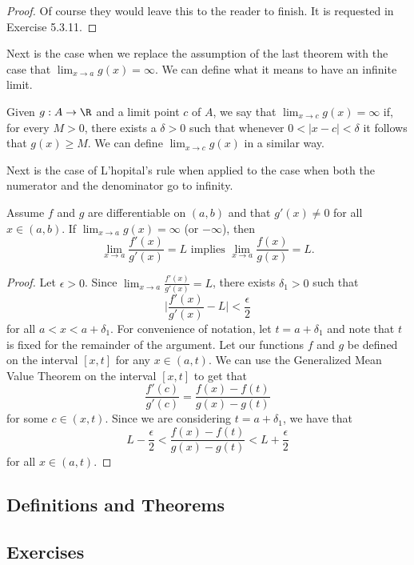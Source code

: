 \begin{proof}
Of course they would leave this to the reader to finish. It is requested in Exercise 5.3.11.
\end{proof}

Next is the case when we replace the assumption of the last theorem with the case that \( \lim_{ x \to a } g(x) = \infty \). We can define what it means to have an infinite limit.

\begin{tcolorbox}
\begin{defn}
Given \( g: A \to \R \) and a limit point \( c  \) of \( A  \), we say that \( \lim_{ x \to c  } g(x) = \infty  \) if, for every \( M > 0  \), there exists a \( \delta > 0  \) such that whenever \( 0 < | x -c  |  < \delta  \) it follows that \( g(x) \geq M  \). We can define \( \lim_{ x \to c  } g(x)  \) in a similar way.
\end{defn}
\end{tcolorbox}
 
Next is the case of L'hopital's rule when applied to the case when both the numerator and the denominator go to infinity.

\begin{tcolorbox}
    \begin{thm}
    Assume \( f  \) and \( g  \) are differentiable on \( (a,b)  \) and that \( g'(x) \neq 0  \) for all \( x \in (a,b) \). If \( \lim_{ x \to a } g(x) = \infty  \) (or \( - \infty  \)), then 
    \[  \lim_{ x \to a } \frac{ f'(x)  }{ g'(x)  } = L \text{~implies~} \lim_{ x \to a } \frac{ f(x)  }{ g(x)  } = L. \]
    \end{thm}
\end{tcolorbox}

\begin{proof}
Let \( \epsilon > 0  \). Since \( \lim_{ x \to a } \frac{ f'(x)  }{ g'(x)  } = L  \), there exists \( \delta_1 > 0  \) such that 
\[   \Big| \frac{ f'(x)  }{ g'(x) } - L  \Big| < \frac{ \epsilon  }{ 2 } \tag{1} \]
for all \( a < x < a + \delta_1  \). For convenience of notation, let \( t = a + \delta_1  \) and note that \( t  \) is fixed for the remainder of the argument. Let our functions \( f  \) and \( g  \) be defined on the interval \( [x,t] \) for any \( x \in (a,t)  \). We can use the Generalized Mean Value Theorem on the interval \( [x,t]  \) to get that 
\[  \frac{ f'(c)  }{ g'(c)  } = \frac{ f(x) - f(t)  }{ g(x) - g(t)  }  \] for some \( c \in (x,t ) \). Since we are considering \( t = a + \delta_1  \), we have that 
\[  L - \frac{ \epsilon  }{ 2 } < \frac{ f(x) - f(t)  }{ g(x) - g(t) } < L + \frac{ \epsilon  }{ 2 } \tag{2}  \] for all \( x \in (a,t). \) 
\end{proof}

\subsection{Definitions and Theorems}



\subsection{Exercises}



